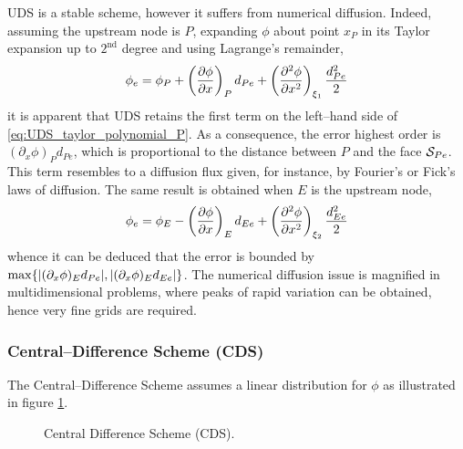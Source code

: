 UDS is a stable scheme, however it suffers from numerical diffusion. Indeed, assuming the upstream node is $P$, expanding $\phi$ about point $x_P$ in its Taylor expansion up to $2^\text{nd}$ degree and using Lagrange's remainder,
\begin{equation} \label{eq:UDS_taylor_polynomial_P}
	\phi_e = 
	\phi_P + \left(\pdv{\phi}{x}\right)_P d_{Pe} + 
	\left(\pdv[2]{\phi}{x}\right)_{\xi_1} \frac{d_{Pe}^2}{2}
\end{equation}
it is apparent that UDS retains the first term on the left--hand side of \eqref{eq:UDS_taylor_polynomial_P}. As a consequence, the error highest order is $(\partial_x \phi)_P d_{Pe}$, which is proportional to the distance between $P$ and the face $\mathcal{S}_{Pe}$. This term resembles to a diffusion flux given, for instance, by Fourier's or Fick's laws of diffusion. The same result is obtained when $E$ is the upstream node,
\begin{equation}
	\phi_e = 
	\phi_E - \left(\pdv{\phi}{x}\right)_E d_{Ee} + \left(\pdv[2]{\phi}{x}\right)_{\xi_2} \frac{d_{Ee}^2}{2}
\end{equation}
whence it can be deduced that the error is bounded by $\max\{ \abs{(\partial_x \phi)_E d_{Pe}}, \abs{(\partial_x \phi)_E d_{Ee}}\}$. The numerical diffusion issue is magnified in multidimensional problems, where peaks of rapid variation can be obtained, hence very fine grids are required. 

\subsubsection{Central--Difference Scheme (CDS)}

The Central--Difference Scheme assumes a linear distribution for $\phi$ as illustrated in figure \ref{fig:central_difference_scheme}. 
\begin{figure}[h]
	\centering
	\caption{Central Difference Scheme (CDS).}
	\label{fig:central_difference_scheme}
\end{figure}

